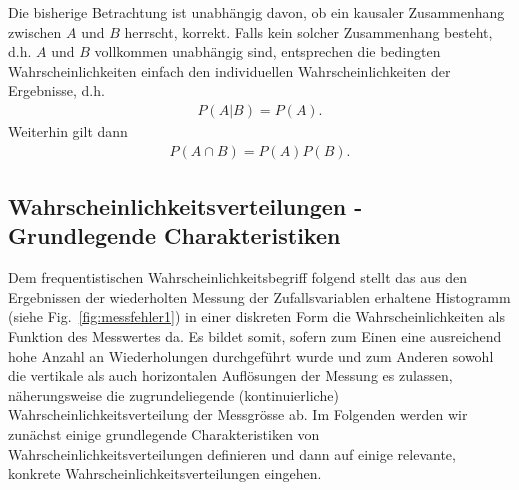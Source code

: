 Die bisherige Betrachtung ist unabhängig davon, ob ein kausaler Zusammenhang zwischen $A$ und $B$ herrscht, korrekt. Falls kein solcher Zusammenhang besteht, d.h. $A$ und $B$ vollkommen unabhängig sind, entsprechen die bedingten Wahrscheinlichkeiten einfach den individuellen Wahrscheinlichkeiten der Ergebnisse, d.h.  
\begin{align}
P ( A | B ) = P(A). 
\end{align}
Weiterhin gilt dann
\begin{align}
 P ( A \cap B ) = P ( A ) P ( B ).
\end{align}

\subsection{Wahrscheinlichkeitsverteilungen - Grundlegende Charakteristiken}

Dem frequentistischen Wahrscheinlichkeitsbegriff folgend stellt das aus den Ergebnissen der wiederholten Messung der Zufallsvariablen erhaltene Histogramm (siehe Fig.~\ref{fig:messfehler1}) in einer diskreten Form die Wahrscheinlichkeiten als Funktion des Messwertes da. Es bildet somit, sofern zum Einen eine ausreichend hohe Anzahl an Wiederholungen durchgeführt wurde und zum Anderen sowohl die vertikale als auch horizontalen Auflösungen der Messung es zulassen, näherungsweise die zugrundeliegende (kontinuierliche) Wahrscheinlichkeitsverteilung der Messgrösse ab. Im Folgenden werden wir zunächst einige grundlegende Charakteristiken von Wahrscheinlichkeitsverteilungen definieren und dann auf einige relevante, konkrete Wahrscheinlichkeitsverteilungen eingehen. \\ 

